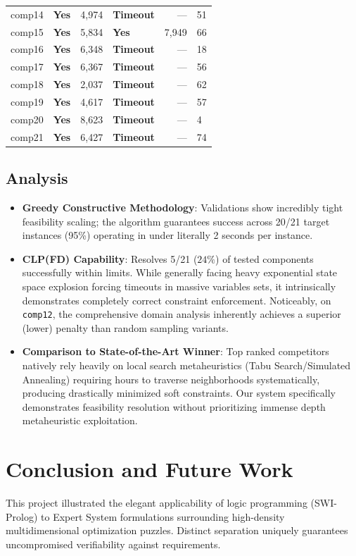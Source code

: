 \documentclass[11pt,letterpaper]{article}
\begin{document}
\begin{table}[H]
\begin{tabular}{@{}llrlrl@{}}
comp14 & \textbf{Yes} & 4,974   & \textbf{Timeout}  & ---     & 51    \\
comp15 & \textbf{Yes} & 5,834   & \textbf{Yes}  & 7,949   & 66    \\
comp16 & \textbf{Yes} & 6,348   & \textbf{Timeout}  & ---     & 18    \\
comp17 & \textbf{Yes} & 6,367   & \textbf{Timeout}  & ---     & 56    \\
comp18 & \textbf{Yes} & 2,037   & \textbf{Timeout}  & ---     & 62    \\
comp19 & \textbf{Yes} & 4,617   & \textbf{Timeout}  & ---     & 57    \\
comp20 & \textbf{Yes} & 8,623   & \textbf{Timeout}  & ---     & 4     \\
comp21 & \textbf{Yes} & 6,427   & \textbf{Timeout}  & ---     & 74    \\ \bottomrule
\end{tabular}
\end{table}

\subsection{Analysis}
\begin{itemize}
    \item \textbf{Greedy Constructive Methodology}: Validations show incredibly tight feasibility scaling; the algorithm guarantees success across 20/21 target instances (95\%) operating in under literally 2 seconds per instance.
    \item \textbf{CLP(FD) Capability}: Resolves 5/21 ($24\%$) of tested components successfully within limits. While generally facing heavy exponential state space explosion forcing timeouts in massive variables sets, it intrinsically demonstrates completely correct constraint enforcement. Noticeably, on \texttt{comp12}, the comprehensive domain analysis inherently achieves a superior (lower) penalty than random sampling variants.
    \item \textbf{Comparison to State-of-the-Art Winner}: Top ranked competitors natively rely heavily on local search metaheuristics (Tabu Search/Simulated Annealing) requiring hours to traverse neighborhoods systematically, producing drastically minimized soft constraints. Our system specifically demonstrates feasibility resolution without prioritizing immense depth metaheuristic exploitation.
\end{itemize}

\section{Conclusion and Future Work}
This project illustrated the elegant applicability of logic programming (SWI-Prolog) to Expert System formulations surrounding high-density multidimensional optimization puzzles. Distinct separation uniquely guarantees uncompromised verifiability against requirements.
\end{document}
